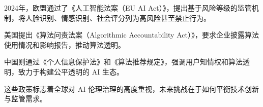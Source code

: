 
2024年，欧盟通过了《人工智能法案（EU AI Act）》，提出基于风险等级的监管机制，将人脸识别、情感识别、社会评分列为高风险甚至禁止行为\cite{EuropeanParliament2024AIAct}。

美国提出《算法问责法案（Algorithmic Accountability Act）》，要求企业披露算法使用情况和影响报告，推动算法透明。

中国则通过《个人信息保护法》和《算法推荐规定》，强调用户知情权和算法透明，致力于构建公平透明的 AI 生态。

这些政策标志着全球对 AI 伦理治理的高度重视，未来挑战在于如何平衡技术创新与监管需求。